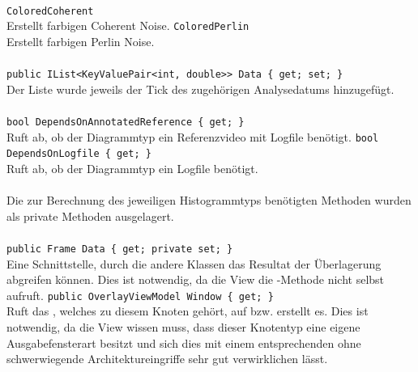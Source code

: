 \paragraph{}
\begin{itemize}
	\add \verb!ColoredCoherent! \\
	Erstellt farbigen Coherent Noise.
	\add \verb!ColoredPerlin! \\
	Erstellt farbigen Perlin Noise.
\end{itemize}

\paragraph{}
\begin{itemize}
	\change \verb!public IList<KeyValuePair<int, double>> Data { get; set; }! \\
	Der Liste wurde jeweils der Tick des zugehörigen Analysedatums hinzugefügt.
\end{itemize}

\paragraph{}
\begin{itemize}
	\add \verb!bool DependsOnAnnotatedReference { get; }! \\
	Ruft ab, ob der Diagrammtyp ein Referenzvideo mit Logfile benötigt.
	\add \verb!bool DependsOnLogfile { get; }! \\
	Ruft ab, ob der Diagrammtyp ein Logfile benötigt.
\end{itemize}

\paragraph{}
\begin{itemize}
	\change Die zur Berechnung des jeweiligen Histogrammtyps benötigten Methoden wurden als private Methoden ausgelagert.
\end{itemize}

\paragraph{}
\begin{itemize}
	\add \verb!public Frame Data { get; private set; }! \\
	Eine Schnittstelle, durch die andere Klassen das Resultat der Überlagerung abgreifen können. Dies ist notwendig, da die View die -Methode nicht selbst aufruft.
	\add \verb!public OverlayViewModel Window { get; }! \\
	Ruft das , welches zu diesem Knoten gehört, auf bzw. erstellt es. Dies ist notwendig, da die View wissen muss, dass dieser Knotentyp eine eigene Ausgabefensterart besitzt und sich dies mit einem entsprechenden  ohne schwerwiegende Architektureingriffe sehr gut verwirklichen lässt.
\end{itemize}

